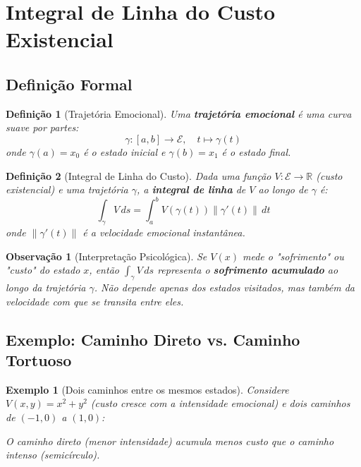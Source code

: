 \documentclass[12pt, a4paper]{article}
\newtheorem{definition}{Definição}
\newtheorem{example}{Exemplo}
\newtheorem{remark}{Observação}
\begin{document}
\section{Integral de Linha do Custo Existencial}

\subsection{Definição Formal}

\begin{definition}[Trajetória Emocional]
Uma \textbf{trajetória emocional} é uma curva suave por partes:
\[
\gamma: [a,b] \to \mathcal{E}, \quad t \mapsto \gamma(t)
\]
onde $\gamma(a) = x_0$ é o estado inicial e $\gamma(b) = x_1$ é o estado final.
\end{definition}

\begin{definition}[Integral de Linha do Custo]
Dada uma função $V: \mathcal{E} \to \mathbb{R}$ (custo existencial) e uma trajetória $\gamma$, a \textbf{integral de linha} de $V$ ao longo de $\gamma$ é:
\[
\int_\gamma V \, ds = \int_a^b V(\gamma(t)) \|\gamma'(t)\| \, dt
\]
onde $\|\gamma'(t)\|$ é a velocidade emocional instantânea.
\end{definition}

\begin{remark}[Interpretação Psicológica]
Se $V(x)$ mede o "sofrimento" ou "custo" do estado $x$, então $\int_\gamma V \, ds$ representa o \textbf{sofrimento acumulado} ao longo da trajetória $\gamma$. Não depende apenas dos estados visitados, mas também da velocidade com que se transita entre eles.
\end{remark}

\subsection{Exemplo: Caminho Direto vs. Caminho Tortuoso}

\begin{example}[Dois caminhos entre os mesmos estados]
Considere $V(x,y) = x^2 + y^2$ (custo cresce com a intensidade emocional) e dois caminhos de $(-1,0)$ a $(1,0)$:


O caminho direto (menor intensidade) acumula menos custo que o caminho intenso (semicírculo).
\end{example}
\end{document}
